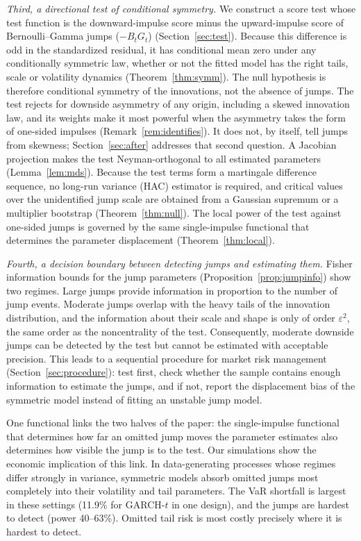 \documentclass[11pt,a4paper]{article}
\theoremstyle{definition}
\theoremstyle{remark}
\begin{document}
\emph{Third, a directional test of conditional symmetry.} We construct a score test whose test function is the downward-impulse score minus the upward-impulse score of Bernoulli--Gamma jumps ($-B_tG_t$) (Section~\ref{sec:test}). Because this difference is odd in the standardized residual, it has conditional mean zero under any conditionally symmetric law, whether or not the fitted model has the right tails, scale or volatility dynamics (Theorem~\ref{thm:symm}). The null hypothesis is therefore conditional symmetry of the innovations, not the absence of jumps. The test rejects for downside asymmetry of any origin, including a skewed innovation law, and its weights make it most powerful when the asymmetry takes the form of one-sided impulses (Remark~\ref{rem:identifies}). It does not, by itself, tell jumps from skewness; Section~\ref{sec:after} addresses that second question. A Jacobian projection makes the test Neyman-orthogonal to all estimated parameters (Lemma~\ref{lem:mds}). Because the test terms form a martingale difference sequence, no long-run variance (HAC) estimator is required, and critical values over the unidentified jump scale are obtained from a Gaussian supremum or a multiplier bootstrap (Theorem~\ref{thm:null}). The local power of the test against one-sided jumps is governed by the same single-impulse functional that determines the parameter displacement (Theorem~\ref{thm:local}).

\emph{Fourth, a decision boundary between detecting jumps and estimating them.} Fisher information bounds for the jump parameters (Proposition~\ref{prop:jumpinfo}) show two regimes. Large jumps provide information in proportion to the number of jump events. Moderate jumps overlap with the heavy tails of the innovation distribution, and the information about their scale and shape is only of order $\varepsilon^2$, the same order as the noncentrality of the test. Consequently, moderate downside jumps can be detected by the test but cannot be estimated with acceptable precision. This leads to a sequential procedure for market risk management (Section~\ref{sec:procedure}): test first, check whether the sample contains enough information to estimate the jumps, and if not, report the displacement bias of the symmetric model instead of fitting an unstable jump model.

One functional links the two halves of the paper: the single-impulse functional that determines how far an omitted jump moves the parameter estimates also determines how visible the jump is to the test. Our simulations show the economic implication of this link. In data-generating processes whose regimes differ strongly in variance, symmetric models absorb omitted jumps most completely into their volatility and tail parameters. The VaR shortfall is largest in these settings (11.9\% for GARCH-$t$ in one design), and the jumps are hardest to detect (power 40--63\%). Omitted tail risk is most costly precisely where it is hardest to detect.
\end{document}
